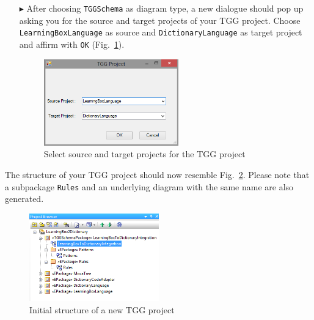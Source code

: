 \begin{enumerate}
\item[$\blacktriangleright$] After choosing \texttt{TGGSchema} as diagram type, a new dialogue should pop up asking you for the source and target projects of your TGG project. 
Choose \texttt{Learning\-Box\-Language} as source and \texttt{Dictionary\-Language} as target project and affirm with \texttt{OK} (Fig.~\ref{fig:select_source_target}).

\begin{figure}[htbp]
\begin{center}
  \includegraphics[width=0.55\textwidth]{pics/tggBilder/tggSchema/tgg2.png}
  \caption{Select source and target projects for the TGG project}  
  \label{fig:select_source_target}
\end{center}
\end{figure}
\end{enumerate}

The structure of your TGG project should now resemble Fig.~\ref{fig:new_tgg_project}.
Please note that a subpackage \texttt{Rules} and an underlying diagram with the same name are also generated.

\begin{figure}[htbp]
\begin{center}
  \includegraphics[width=0.5\textwidth]{pics/tggBilder/tggSchema/tgg3.png}
  \caption{Initial structure of a new TGG project}  
  \label{fig:new_tgg_project}
\end{center}
\end{figure}

